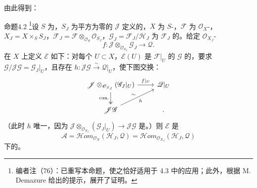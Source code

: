 由此得到：
\begin{SGAresult}{命题}{4.2}
\footnote{编者注（76）：已重写本命题，使之恰好适用于 4.3 中的应用；此外，根据 M. Demazure 给出的提示，展开了证明。}设 $S$ 为，$S_J$ 为平方为零的 $\mathscr J$ 定义的，$X$ 为 $S$-，$\mathscr F$ 为 $\mathscr O_X$-，$X_J=X\times_S S_J$，$\mathscr F_J=\mathscr F\otimes_{\mathscr O_S}\mathscr O_{S_J}$，$\mathscr G_J=\mathscr F_J/\mathscr H_J$ 为 $\mathscr F_J$ 的。给定 $\mathscr O_{X_J}$-
\[f:\mathscr J\otimes_{\mathscr O_{S_J}}\mathscr G_J\longrightarrow\mathscr Q.\]
在 $X$ 上定义 $\mathscr E$ 如下：对每个 $U\subset X$，$\mathscr E(U)$ 是 $\mathscr F|_U$ 的 $\mathscr G$ 的，要求 $\mathscr G/\mathscr J\mathscr G=\mathscr G_J|_U$，且存在 $h:\mathscr J\mathscr G\xrightarrow\sim\mathscr Q|_U$，使下图交换：
\[
\begin{tikzcd}
\mathscr J\otimes_{\mathscr O_{S_J}}(\mathscr G_J|_U)\arrow[r,"f|_U"]\arrow[d,two heads,"\mathrm{can.}"']&\mathscr Q|_U\\
\mathscr J\mathscr G\arrow[ur,"h"',"\sim"]&.
\end{tikzcd}
\]
（此时 $h$ 唯一，因为 $\mathscr J\otimes_{\mathscr O_{S_J}}(\mathscr G_J|_U)\to\mathscr J\mathscr G$ 是。）则 $\mathscr E$ 是
\[\mathscr A=\mathscr Hom_{\mathscr O_X}(\mathscr H_J,\mathscr Q)=\mathscr Hom_{\mathscr O_{X_J}}(\mathscr H_J,\mathscr Q)\]
下的。
\end{SGAresult}
